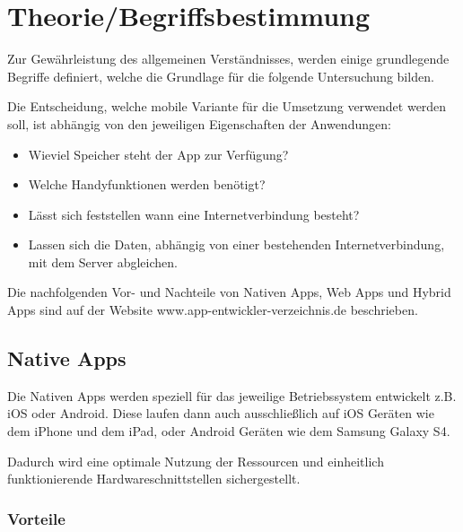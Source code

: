 %
\chapter{Theorie/Begriffsbestimmung}
\label{sec:theorie:Theorie}


Zur Gewährleistung des allgemeinen Verständnisses, werden einige grundlegende Begriffe definiert, welche die Grundlage für die folgende Untersuchung bilden.

Die Entscheidung, welche mobile Variante für die Umsetzung verwendet werden soll, ist abhängig von den jeweiligen Eigenschaften der Anwendungen:

\begin{itemize}
	\item Wieviel Speicher steht der App zur Verfügung?
	\item Welche Handyfunktionen werden benötigt?
	\item Lässt sich feststellen wann eine Internetverbindung besteht?
	\item Lassen sich die Daten, abhängig von einer bestehenden Internetverbindung, mit dem Server abgleichen.
\end{itemize}

Die nachfolgenden Vor- und Nachteile von Nativen Apps, Web Apps und Hybrid Apps sind auf der Website www.app-entwickler-verzeichnis.de beschrieben.\cite[]{WEB:APPEV:2014}

\section{Native Apps}
\label{sec:intro:native}

Die Nativen Apps werden speziell für das jeweilige Betriebssystem entwickelt z.B. iOS oder Android. Diese laufen dann auch ausschließlich auf iOS Geräten wie dem iPhone und dem iPad, oder Android Geräten wie dem Samsung Galaxy S4.

Dadurch wird eine optimale Nutzung der Ressourcen und einheitlich funktionierende Hardwareschnittstellen sichergestellt.

\subsection{Vorteile}
\label{sec:native:pros}

